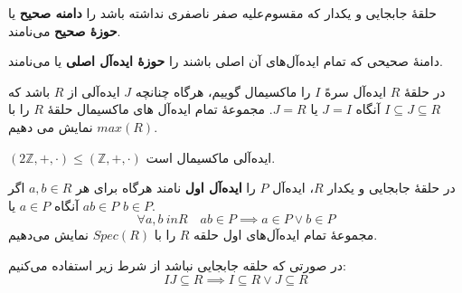 \begin{frame}

    \begin{definition}
        حلقهٔ جابجایی و یکدار که مقسوم‌علیه صفر ناصفری نداشته باشد را \textbf{دامنه صحیح} یا  \textbf{حوزهٔ صحیح} می‌نامند.
    \end{definition}

    \begin{definition}
        دامنهٔ صحیحی که تمام ایده‌آل‌های آن اصلی باشند را \textbf{حوزهٔ ایده‌آل اصلی} یا   می‌نامند.
    \end{definition}

    \begin{definition}

        در حلقهٔ
        \(R\)
        ایده‌آل سرهً
        \(I\)
        را ماکسیمال گوییم، هرگاه چنانچه
        \(J\)
        ایده‌آلی از
        \(R\)
        باشد که
        \(I \subseteq J \subseteq R\)
        آنگاه
        \(J = I\)
        یا
        \(J = R\).
        مجموعهٔ تمام ایده‌آل های ماکسیمال حلقهٔ \(R\) را با
        \(max (R)\)
        نمایش می دهیم.


    \end{definition}


\end{frame}

\begin{frame}
    \begin{example}
        $(2\mathbb{Z}, +, \cdot) \leqslant (\mathbb{Z}, +, \cdot)$
        ایده‌آلی ماکسیمال است.
    \end{example}

    \begin{definition}
        در حلقهٔ جابجایی و یکدار $R$، ایده‌آل $P$ را \textbf{ایده‌آل اول} نامند هرگاه برای هر $a,b \in R$ اگر $ab \in P$ آنگاه $a \in P$ یا $b \in P$.
        \[\forall a, b \ in R \quad ab \in P \implies a \in P \lor b \in P\]
        مجموعهٔ تمام ایده‌آل‌های اول حلقه $R$ را با $Spec(R)$ نمایش می‌دهیم.

    \end{definition}


    \begin{remark}
        در صورتی که حلقه جابجایی نباشد از شرط زیر استفاده می‌کنیم:
        \[
            IJ \subseteq R \implies I \subseteq R \lor J \subseteq R
        \]
    \end{remark}


\end{frame}

